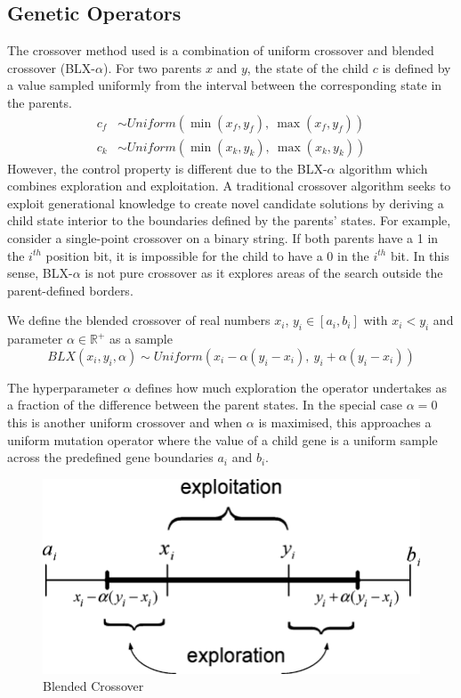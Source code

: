 \subsection{Genetic Operators}
The crossover method used is a combination of uniform crossover and blended crossover (BLX-$\alpha$). For two parents $x$ and $y$, the state of the child $c$ is defined by a value sampled uniformly from the interval between the corresponding state in the parents.
\begin{align*}
  c_f &\sim \mathit{Uniform}(\min(x_f, y_f),\ \max(x_f, y_f))\\
  c_k &\sim \mathit{Uniform}(\min(x_k, y_k),\ \max(x_k, y_k))
\end{align*}
However, the control property is different due to the BLX-$\alpha$ algorithm which combines exploration and exploitation. A traditional crossover algorithm seeks to exploit generational knowledge to create novel candidate solutions by deriving a child state interior to the boundaries defined by the parents' states. For example, consider a single-point crossover on a binary string. If both parents have a 1 in the $i^{th}$ position bit, it is impossible for the child to have a 0 in the $i^{th}$ bit. In this sense, BLX-$\alpha$ is not pure crossover as it explores areas of the search outside the parent-defined borders.

\begin{definition}
We define the blended crossover of real numbers $x_i$, $y_i \in [a_i, b_i]$ with $x_i < y_i$ and parameter $\alpha \in \mathbb{R^+}$ as a sample\\
\[
  BLX(x_i, y_i, \alpha) \sim \mathit{Uniform}(x_i - \alpha(y_i - x_i),\  y_i + \alpha(y_i - x_i))
\]
\end{definition}
The hyperparameter $\alpha$ defines how much exploration the operator undertakes as a fraction of the difference between the parent states. In the special case $\alpha = 0$ this is another uniform crossover and when $\alpha$ is maximised, this approaches a uniform mutation operator where the value of a child gene is a uniform sample across the predefined gene boundaries $a_i$ and $b_i$.\\

\begin{figure}[!h]
\centering
    \includegraphics[width=.5\textwidth]{images/blx.png}
    \caption{Blended Crossover \cite{abido2006multiobjective}}
\label{fig:blx-alpha}
\end{figure}


